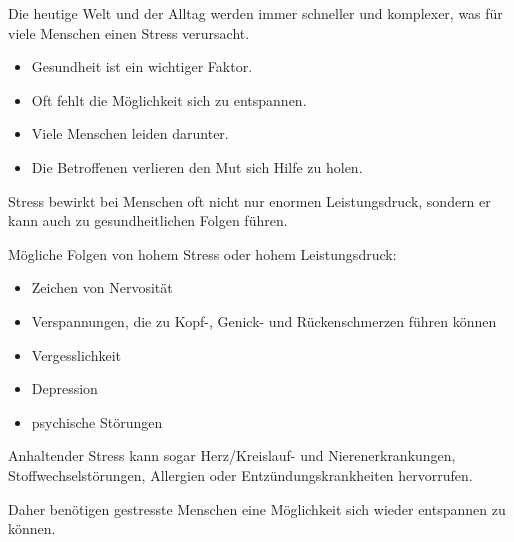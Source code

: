 \begin{spacing}{1}
    
    Die heutige Welt und der Alltag werden immer schneller und komplexer, 
    was für viele Menschen einen Stress verursacht. 

    \begin{itemize}
        \item Gesundheit ist ein wichtiger Faktor.
        \item Oft fehlt die Möglichkeit sich zu entspannen.
        \item Viele Menschen leiden darunter.
        \item Die Betroffenen verlieren den Mut sich Hilfe zu holen.
    \end{itemize}

    Stress bewirkt bei Menschen oft nicht nur enormen Leistungsdruck, sondern er kann auch zu gesundheitlichen 
    Folgen führen. 

    Mögliche Folgen von hohem Stress oder hohem Leistungsdruck:
    
    \begin{itemize}
        \item Zeichen von Nervosität
        \item Verspannungen, die zu Kopf-, Genick- und Rückenschmerzen führen können
        \item Vergesslichkeit
        \item Depression
        \item psychische Störungen
    \end{itemize}

    Anhaltender Stress kann sogar Herz/Kreislauf- und Nierenerkrankungen, Stoffwechselstörungen, Allergien oder
    Entzündungskrankheiten hervorrufen. \cite{stress}

    Daher benötigen gestresste Menschen eine Möglichkeit sich wieder entspannen zu können.

\end{spacing}
